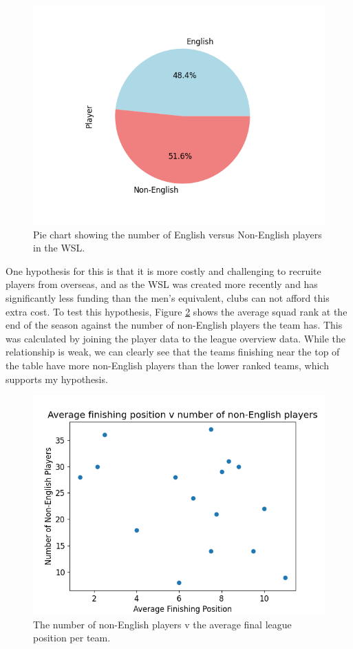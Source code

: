 \documentclass[12pt, a4paper, twocolumn]{article}
\begin{document}
\begin{figure}
  \includegraphics[width=\linewidth]{../vis/playerStats/nation_pie.png}
  \caption{Pie chart showing the number of English versus Non-English players in the WSL.}
  \label{nation_pie}
\end{figure}

One hypothesis for this is that it is more costly and challenging to recruite players from overseas, and as the WSL was created more recently and has significantly less funding than the men's equivalent, clubs can not afford this extra cost. To test this hypothesis, Figure \ref{nation_rank} shows the average squad rank at the end of the season against the number of non-English players the team has. This was calculated by joining the player data to the league overview data. While the relationship is weak, we can clearly see that the teams finishing near the top of the table have more non-English players than the lower ranked teams, which supports my hypothesis.

\begin{figure}
  \includegraphics[width=\linewidth]{../vis/playerStats/nation_rank.png}
  \caption{The number of non-English players v the average final league position per team.}
  \label{nation_rank}
\end{figure}
\end{document}
